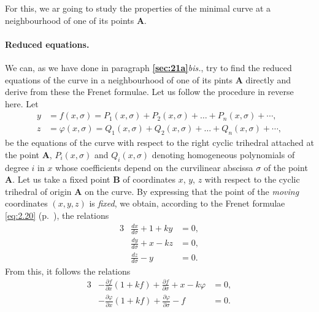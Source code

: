 \documentclass[leqno,11pt]{book}
\makeatletter
\numberwithin{equation}{chapter}
\newcommand{\pd}{\partial}
\theoremstyle{shape1}
\theoremstyle{shapesmall}
\let\old@phi\phi
\let\old@varphi\varphi
\let\phi\old@varphi
\let\varphi\old@phi
\newcommand{\fsref}[1]{{\rm\textsection\textbf{\ref{sec:#1}}}}
\makeatother
\begin{document}
For this, we ar going to study the properties of the minimal curve at a neighbourhood of one of its points $\mathbf{A}$.


\paragraph{Reduced equations.}
\label{sec:39}
We can, as we have done in paragraph \fsref{21a}\textit{bis.}, try to find the reduced equations of the curve in a neighbourhood of one of its pints $\mathbf{A}$ directly and derive from these the Frenet formulae. Let us follow the procedure in reverse here. Let
\begin{align*}
  y&=f(x,\sigma)=P_{1}(x,\sigma)+P_{2}(x,\sigma)+\dots+P_{n}(x,\sigma)+\cdots,\\
  z&=\phi(x,\sigma)=Q_{1}(x,\sigma)+Q_{2}(x,\sigma)+\dots+Q_{n}(x,\sigma)+\cdots,
\end{align*}
be the equations of the curve with respect to the right cyclic trihedral attached at the point $\mathbf{A}$, $P_{i}(x,\sigma)$ and $Q_{i}(x,\sigma)$ denoting homogeneous polynomials of degree $i$ in $x$ whose coefficients depend on the curvilinear abscissa $\sigma$ of the point $\mathbf{A}$. Let us take a fixed point $\mathbf{B}$ of coordinates $x$, $y$, $z$ with respect to the cyclic trihedral of origin $\mathbf{A}$ on the curve. By expressing that the point of the \emph{moving} coordinates $(x,y,z)$ is \emph{fixed}, we obtain, according to the Frenet formulae \eqref{eq:2.20} (p.~\pageref{eq:2.20}), the relations
\begin{alignat*}{3}
  &\frac{dx}{d\sigma}+1+ky&{}={}0,\\
  &\frac{dy}{d\sigma}+x-kz&{}={}0,\\
  &\frac{dz}{d\sigma}-y&{}={}0.
\end{alignat*}
From this, it follows the relations
\begin{alignat*}{3}
  &-\frac{\pd f}{\pd x}(1+kf)+\frac{\pd f}{\pd\sigma}+x-k\phi&{}=0,\\
  &-\frac{\pd \phi}{\pd x}(1+kf)+\frac{\pd \phi}{\pd\sigma}-f&{}=0.  
\end{alignat*}
\end{document}
